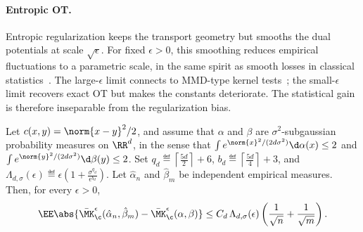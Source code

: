\paragraph{Entropic OT.}
Entropic regularization keeps the transport geometry but smooths the dual potentials at scale \(\sqrt\epsilon\). For fixed \(\epsilon>0\), this smoothing reduces empirical fluctuations to a parametric scale, in the same spirit as smooth losses in classical statistics~\cite{genevay2018sample,bigot2017central,mena2019statistical}. The large-\(\epsilon\) limit connects to MMD-type kernel tests~\cite{feydy2018interpolating,gretton2012kernel}; the small-\(\epsilon\) limit recovers exact OT but makes the constants deteriorate. The statistical gain is therefore inseparable from the regularization bias.

\begin{prop}\label{prop-sinkhorn-sample-rate}
	Let \(c(x,y)=\norm{x-y}^2/2\), and assume that \(\alpha\) and \(\beta\) are \(\sigma^2\)-subgaussian probability measures on \(\RR^d\), in the sense that
	$\int e^{\norm{x}^2/(2d\sigma^2)}\d\alpha(x)\leq2$ and $\int e^{\norm{y}^2/(2d\sigma^2)}\d\beta(y)\leq2$.
	Set
	$q_d\eqdef\left\lceil\frac{5d}{2}\right\rceil+6$, $b_d\eqdef\left\lceil\frac{5d}{4}\right\rceil+3$, and $\Lambda_{d,\sigma}(\epsilon) \eqdef \epsilon\left(1+\frac{\sigma^{q_d}}{\epsilon^{b_d}}\right)$.
	Let \(\hat\alpha_n\) and \(\hat\beta_m\) be independent empirical measures. Then, for every \(\epsilon>0\),
	\[
		\EE\abs{\bar\MK_\c^\epsilon(\hat\alpha_n,\hat\beta_m)-\bar\MK_\c^\epsilon(\alpha,\beta)}
		\leq
		C_d\,\Lambda_{d,\sigma}(\epsilon)
		\left(\frac1{\sqrt n}+\frac1{\sqrt m}\right).
	\]
\end{prop}

